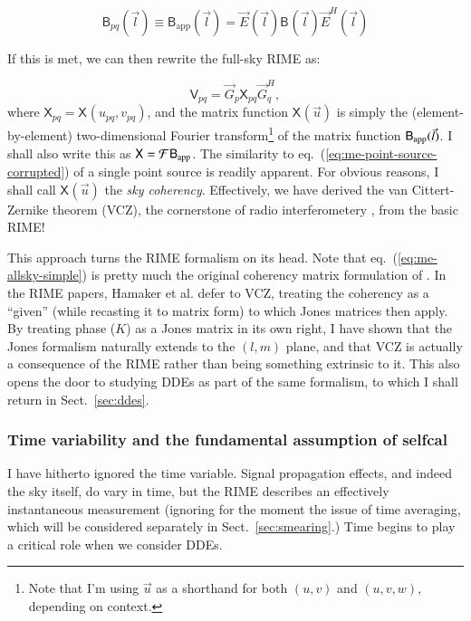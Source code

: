 \documentclass[]{aa}
\newcommand{\herm}{H}
\newcommand{\jones}[2]{\vec {#1}_{#2}}
\newcommand{\jonesT}[2]{\vec {#1}^{\herm}_{#2}}
\newcommand{\coh}[2]{\mathsf{{#1}}_{{#2}}}
\begin{document}
\[
\coh{B}{pq}(\vec l) \equiv \coh{B}{\mathrm{app}}(\vec l) =  \jones{E}{}(\vec l) \coh{B}{}(\vec l) \jonesT{E}{}(\vec l)
\]

If this is met, we can then rewrite the full-sky RIME as:

\begin{equation}\label{eq:me-allsky-simple}
\coh{V}{pq} = \jones{G}{p} \coh{X}{pq} \jonesT{G}{q},
\end{equation}
where $\coh{X}{pq} = \coh{X}{}(u_{pq},v_{pq})$, and the matrix function $\coh{X}{}(\vec u)$ is simply the (element-by-element) two-dimensional Fourier transform\footnote{Note that I'm using $\vec u$ as a shorthand for both $(u,v)$ and $(u,v,w)$, depending on context.}
of the matrix function $\coh{B}{\rm app}(\vec l)$. I shall also write this as $\coh{X}{}={\cal F}\coh{B}{\mathrm{app}}$. The similarity to eq.~(\ref{eq:me-point-source-corrupted}) of a single point source is readily apparent. For obvious reasons, I shall call $\coh{X}{}(\vec u)$ the {\em sky coherency}. Effectively, we have derived the van Cittert-Zernike theorem (VCZ), the cornerstone of radio interferometery \citep[Sect.~14.1]{tms}, from the basic RIME! 

This approach turns the RIME formalism on its head. Note that eq.~(\ref{eq:me-allsky-simple}) is pretty much the original coherency matrix formulation of \citet[eq.~2]{ME4}. In the RIME papers, Hamaker et al. defer to VCZ, treating the coherency as a ``given'' (while recasting it to matrix form) to which Jones matrices then apply. By treating phase ($K$) as a Jones matrix in its own right, I have shown that the Jones formalism naturally extends to the $(l,m)$ plane, and that VCZ is actually a consequence of the RIME rather than being something extrinsic to it. This also opens the door to studying DDEs as part of the same formalism, to which I shall return in Sect.~\ref{sec:ddes}.

\subsubsection{Time variability and the fundamental assumption of selfcal\label{sec:timevar}}

I have hitherto ignored the time variable. Signal propagation effects, and indeed the sky itself, do vary in time, but the RIME describes an effectively instantaneous measurement (ignoring for the moment the issue of time averaging, which will be considered separately in Sect.~\ref{sec:smearing}.) Time begins to play a critical role when we consider DDEs. 
\end{document}
